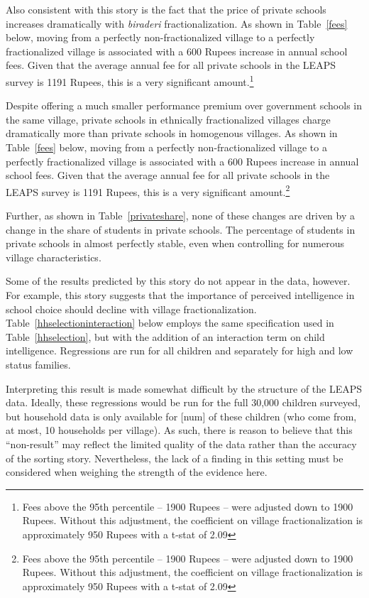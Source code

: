 \documentclass[12pt]{article}
\begin{document}


Also consistent with this story is the fact that the price of private schools increases dramatically with \emph{biraderi} fractionalization. As shown in Table~\ref{fees} below, moving from a perfectly non-fractionalized village to a perfectly fractionalized village is associated with a 600 Rupees increase in annual school fees. Given that the average annual fee for all private schools in the LEAPS survey is 1191 Rupees, this is a very significant amount.\footnote{Fees above the 95th percentile -- 1900 Rupees -- were adjusted down to 1900 Rupees. Without this adjustment, the coefficient on village fractionalization is approximately 950 Rupees with a t-stat of 2.09} 




Despite offering a much smaller performance premium over government schools in the same village, private schools in ethnically fractionalized villages charge dramatically more than private schools in homogenous villages. As shown in Table~\ref{fees} below, moving from a perfectly non-fractionalized village to a perfectly fractionalized village is associated with a 600 Rupees increase in annual school fees. Given that the average annual fee for all private schools in the LEAPS survey is 1191 Rupees, this is a very significant amount.\footnote{Fees above the 95th percentile -- 1900 Rupees -- were adjusted down to 1900 Rupees. Without this adjustment, the coefficient on village fractionalization is approximately 950 Rupees with a t-stat of 2.09} 

Further, as shown in Table~\ref{privateshare}, none of these changes are driven by a change in the share of students in private schools. The percentage of students in private schools in almost perfectly stable, even when controlling for numerous village characteristics. 




Some of the results predicted by this story do not appear in the data, however. For example, this story suggests that the importance of perceived intelligence in school choice should decline with village fractionalization. Table~\ref{hhselectioninteraction} below employs the same specification used in Table~\ref{hhselection}, but with the addition of an interaction term on child intelligence. Regressions are run for all children and separately for high and low status families. 

Interpreting this result is made somewhat difficult by the structure of the LEAPS data. Ideally, these regressions would be run for the full 30,000 children surveyed, but household data is only available for [num] of these children (who come from, at most, 10 households per village). As such, there is reason to believe that this ``non-result'' may reflect the limited quality of the data rather than the accuracy of the sorting story. Nevertheless, the lack of a finding in this setting must be considered when weighing the strength of the evidence here. 
\end{document}
